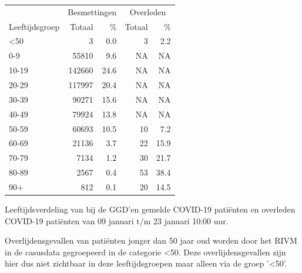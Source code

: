 \documentclass[
  english,
  man,floatsintext]{apa6}
\begin{document}
\begin{table}
\centering\begingroup\fontsize{11}{13}\selectfont

\begin{threeparttable}
\begin{tabular}{lrrrr}
\toprule
\multicolumn{1}{c}{ } & \multicolumn{2}{c}{Besmettingen} & \multicolumn{2}{c}{Overleden} \\
\cmidrule(l{3pt}r{3pt}){2-3} \cmidrule(l{3pt}r{3pt}){4-5}
Leeftijdsgroep & Totaal & \% & Totaal & \%\\
\midrule
<50 & 3 & 0.0 & 3 & 2.2\\
0-9 & 55810 & 9.6 & NA & NA\\
10-19 & 142660 & 24.6 & NA & NA\\
20-29 & 117997 & 20.4 & NA & NA\\
30-39 & 90271 & 15.6 & NA & NA\\
40-49 & 79924 & 13.8 & NA & NA\\
50-59 & 60693 & 10.5 & 10 & 7.2\\
60-69 & 21136 & 3.7 & 22 & 15.9\\
70-79 & 7134 & 1.2 & 30 & 21.7\\
80-89 & 2567 & 0.4 & 53 & 38.4\\
90+ & 812 & 0.1 & 20 & 14.5\\
\bottomrule
\end{tabular}
\begin{tablenotes}
\item[1] Leeftijdsverdeling van bij de GGD’en gemelde COVID-19 patiënten en overleden COVID-19 patiënten van 09 januari t/m 23 januari 10:00 uur.
\item[2] Overlijdensgevallen van patiënten jonger dan 50 jaar oud worden door het RIVM in de casusdata gegroepeerd in de categorie <50. Deze overlijdensgevallen zijn hier dus niet zichtbaar in deze leeftijdsgroepen maar alleen via de groep '<50'.
\end{tablenotes}
\end{threeparttable}
\endgroup{}
\end{table}

\newpage
\end{document}
